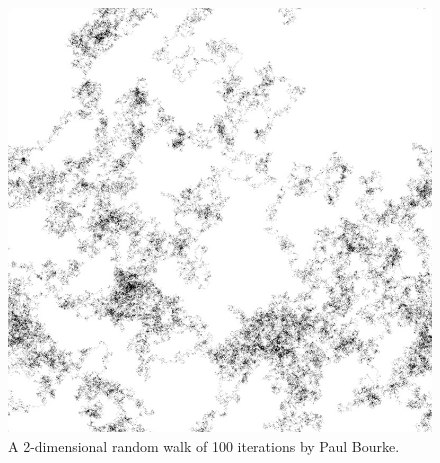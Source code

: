 \cleardoublepage
{}
{}


\vspace*{\fill}

\singlespace
\begin{figure}[h]
    \centering
  \includegraphics[width=0.50\linewidth]{figures/walk100.jpg}
  \caption{A 2-dimensional random walk of 100 iterations by Paul Bourke.}
  \label{fig:100-iteration random walk}
\end{figure}

\vspace*{\fill}

\doublespace